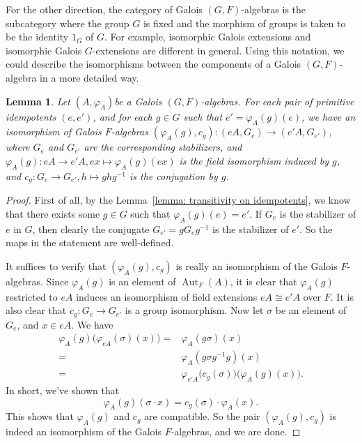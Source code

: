 \documentclass[12pt,a4paper]{amsart}
\numberwithin{equation}{section}%
\theoremstyle{plain}%
\newtheorem{lemma}[theorem]{Lemma}%
\theoremstyle{definition}%
\theoremstyle{remark}%
\begin{document}
	For the other direction, the category of Galois $(G,F)$-algebras is the subcategory where the group $G$ is fixed and the morphism of groups is taken to be the identity $1_G$ of $G$.
	For example, isomorphic Galois extensions and isomorphic Galois $G$-extensions are different in general.
	Using this notation, we could describe the isomorphisms between the components of a Galois $(G,F)$-algebra in a more detailed way.
	\begin{lemma}\label{lemma: isomorphisms of G-algebras}
		Let $(A,\varphi_A)$be a Galois $(G,F)$-algebras.
		For each pair of primitive idempotents $(e,e')$, and for each $g\in G$ such that $e'=\varphi_A(g)(e)$, we have an isomorphism of Galois $F$-algebras $(\varphi_A(g),c_g):(eA,G_e)\to(e'A,G_{e'})$, where $G_e$ and $G_{e'}$ are the corresponding stabilizers, and $\varphi_A(g):eA\to e'A,ex\mapsto\varphi_A(g)(ex)$ is the field isomorphism induced by $g$, and $c_g:G_e\to G_{e'},h\mapsto ghg^{-1}$ is the conjugation by $g$.
	\end{lemma}
	\begin{proof}
		First of all, by the Lemma~\ref{lemma: transitivity on idempotents}, we know that there exists some $g\in G$ such that $\varphi_A(g)(e)=e'$.
		If $G_e$ is the stabilizer of $e$ in $G$, then clearly the conjugate $G_{e'}=gG_eg^{-1}$ is the stabilizer of $e'$.
		So the maps in the statement are well-defined.
		
		It suffices to verify that $(\varphi_A(g),c_g)$ is really an isomorphism of the Galois $F$-algebras.
		Since $\varphi_A(g)$ is an element of $\operatorname{Aut}_F(A)$, it is clear that $\varphi_A(g)$ restricted to $eA$ induces an isomorphism of field extensions $eA\cong e'A$ over $F$.
		It is also clear that $c_g:G_e\to G_{e'}$ is a group isomorphism.
		Now let $\sigma$ be an element of $G_e$, and $x\in eA$.
		We have
		\begin{equation*}
			\begin{aligned}
				\varphi_A(g)\bigl(\varphi_{eA}(\sigma)(x)\bigr)=&\varphi_A(g\sigma)(x)
				\\
				=&\varphi_A(g\sigma g^{-1}g)(x)
				\\
				=&\varphi_{e'A}\bigl(c_g(\sigma)\bigr)\bigl(\varphi_A(g)(x)\bigr).
			\end{aligned}
		\end{equation*}
		In short, we've shown that
		\begin{equation*}
			\varphi_A(g)(\sigma\cdot x)=c_g(\sigma)\cdot\varphi_A(x).
		\end{equation*}
		This shows that $\varphi_A(g)$ and $c_g$ are compatible.
		So the pair $(\varphi_A(g),c_g)$ is indeed an isomorphism of the Galois $F$-algebras, and we are done.
	\end{proof}
\end{document}

